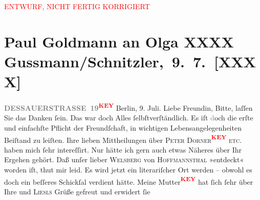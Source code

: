 
\begin{center}
            \textcolor{red}{ENTWURF, NICHT FERTIG KORRIGIERT}
                      \end{center}
            
         
         \renewcommand{\erwaehntePersonen}{Personen: Hugo von Hofmannsthal, Olga Schnitzler, Elisabeth Steinrück}
         \renewcommand{\erwaehnteOrte}{Orte: Berlin, Welsberg-Taisten, Wien}
         \renewcommand{\erwaehnteWerke}{}
               \section[ Paul Goldmann an Olga XXXX Gussmann/Schnitzler, 9. 7. {[}XXXX{]}]{ Paul Goldmann an Olga XXXX Gussmann/Schnitzler, 9. 7. {[}XXXX{]}}\nopagebreak{}\rehead{ }\begin{ledgroupsized}[t]{13cm}\normalsize\beginnumbering \toendnotes[C]{\smallbreak\pagebreak[2]} 
\toendnotes[C]{\smallbreak}{\pb}\textcolor{gray}{\textbf{DESSAUERSTRASSE 19}}\textcolor{red}{\textsuperscript{\textbf{KEY}}}\pstart
           Berlin, 9. Juli.\pend
           \pstart{}Liebe Freundin,\pend\pstart
           Bitte, laſſen Sie das Danken ſein. Das war doch Alles ſelbſtverſtändlich. Es iſt
                  \textcolor{gray}{d}och die erſte und einfachſte Pflicht der Freundſchaft, in
               wichtigen Lebensangelegenheiten Beiſtand zu leiſten.\pend
           \pstart
           Ihre lieben Mittheilungen über \textsc{Peter Dorner\textcolor{red}{\textsuperscript{\textbf{KEY}}} etc}. haben mich ſehr intereſſirt.
               Nur hätte ich gern auch etwas Näheres über Ihr Ergehen gehört.\pend
           \pstart
           Daß unſer lieber \textsc{Welsberg} von \textsc{Hoffmannsthal} »entdeckt« worden iſt, thut mir leid. Es wird jetzt ein literariſcher Ort
               werden – obwohl  es doch ein beſſeres
               Schickſal verdient hätte.\pend
           \pstart
           Meine Mutter\textcolor{red}{\textsuperscript{\textbf{KEY}}} hat ſich ſehr über Ihre und \textsc{Liesls} Grüße gefreut und erwidert ſie

\end{ledgroupsized}
